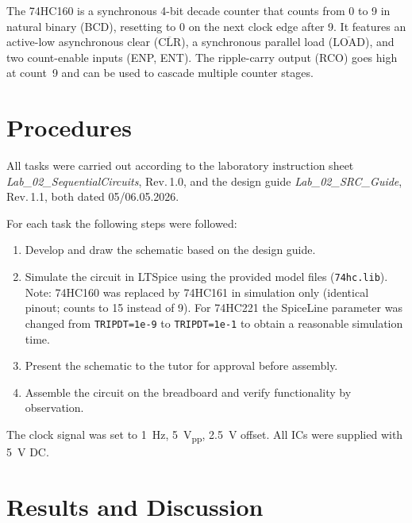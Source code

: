 \documentclass[12pt, a4paper]{article}
\begin{document}
The 74HC160 is a synchronous 4-bit decade counter that counts from 0 to 9 in
natural binary (BCD), resetting to 0 on the next clock edge after 9.
It features an active-low asynchronous clear ($\overline{\text{CLR}}$), a
synchronous parallel load ($\overline{\text{LOAD}}$), and two count-enable inputs
(ENP, ENT).
The ripple-carry output (RCO) goes high at count~9 and can be used to cascade
multiple counter stages.

\section{Procedures}

All tasks were carried out according to the laboratory instruction sheet
\textit{Lab\_02\_SequentialCircuits}, Rev.\,1.0, and the design guide
\textit{Lab\_02\_SRC\_Guide}, Rev.\,1.1, both dated 05/06.05.2026.

For each task the following steps were followed:
\begin{enumerate}[leftmargin=1.5em]
  \item Develop and draw the schematic based on the design guide.
  \item Simulate the circuit in LTSpice using the provided model files
        (\texttt{74hc.lib}). Note: 74HC160 was replaced by 74HC161 in simulation
        only (identical pinout; counts to 15 instead of 9). For 74HC221 the
        SpiceLine parameter was changed from \texttt{TRIPDT=1e-9} to
        \texttt{TRIPDT=1e-1} to obtain a reasonable simulation time.
  \item Present the schematic to the tutor for approval before assembly.
  \item Assemble the circuit on the breadboard and verify functionality by
        observation.
\end{enumerate}

The clock signal was set to \SI{1}{\hertz}, \SI{5}{\volt_{pp}}, \SI{2.5}{\volt}
offset. All ICs were supplied with \SI{5}{\volt} DC.

\section{Results and Discussion}
\end{document}
